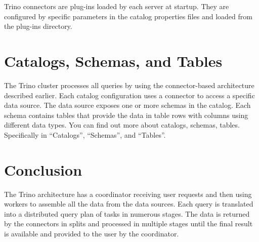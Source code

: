Trino connectors are plug-ins loaded by each server at startup. They are configured by specific parameters in the catalog properties files and loaded from the plug-ins directory. 

\section{Catalogs, Schemas, and Tables}
The Trino cluster processes all queries by using the connector-based architecture described earlier. Each catalog configuration uses a connector to access a specific data source. The data source exposes one or more schemas in the catalog. Each schema contains tables that provide the data in table rows with columns using different data types. You can find out more about catalogs, schemas, tables. Specifically in “Catalogs”, “Schemas”, and “Tables”.


\section*{Conclusion}
The Trino architecture has a coordinator receiving user requests and then using workers to assemble all the data from the data sources. Each query is translated into a distributed query plan of tasks in numerous stages. The data is returned by the connectors in splits and processed in multiple stages until the final result is available and provided to the user by the coordinator.